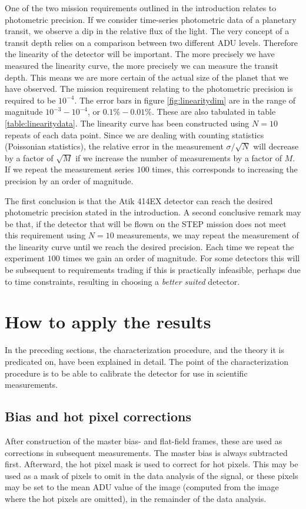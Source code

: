 \documentclass[../main.tex]{subfiles}
\begin{document}
	One of the two mission requirements outlined in the introduction relates to photometric precision. If we consider time-series photometric data of a planetary transit, we observe a dip in the relative flux of the light. The very concept of a transit depth relies on a comparison between two different ADU levels. Therefore the linearity of the detector will be important. The more precisely we have measured the linearity curve, the more precisely we can measure the transit depth. This means we are more certain of the actual size of the planet that we have observed. The mission requirement relating to the photometric precision is required to be $10^{-4}$. The error bars in figure \ref{fig:linearitydim} are in the range of magnitude $10^{-3}-10^{-4}$, or $0.1\% - 0.01\%$. These are also tabulated in table \ref{table:linearitydata}. The linearity curve has been constructed using $N = 10$ repeats of each data point. Since we are dealing with counting statistics (Poissonian statistics), the relative error in the measurement $\sigma / \sqrt{N}$ will decrease by a factor of $\sqrt{M}$ if we increase the number of measurements by a factor of $M$. If we repeat the measurement series $100$ times, this corresponds to increasing the precision by an order of magnitude. 
	
	The first conclusion is that the Atik 414EX detector can reach the desired photometric precision stated in the introduction. A second conclusive remark may be that, if the detector that will be flown on the STEP mission does not meet this requirement using $N = 10$ measurements, we may repeat the measurement of the linearity curve until we reach the desired precision. Each time we repeat the experiment $100$ times we gain an order of magnitude. For some detectors this will be subsequent to requirements trading if this is practically infeasible, perhaps due to time constraints, resulting in choosing a \textit{better suited} detector.
	
	\section{How to apply the results}\label{sect:cal}
	In the preceding sections, the characterization procedure, and the theory it is predicated on, have been explained in detail. The point of the characterization procedure is to be able to calibrate the detector for use in scientific measurements. 
	
	\subsection{Bias and hot pixel corrections}
	After construction of the master bias- and flat-field frames, these are used as corrections in subsequent measurements. The master bias is always subtracted first. Afterward, the hot pixel mask is used to correct for hot pixels. This may be used as a mask of pixels to omit in the data analysis of the signal, or these pixels may be set to the mean ADU value of the image (computed from the image where the hot pixels are omitted), in the remainder of the data analysis. 
	
\end{document}
